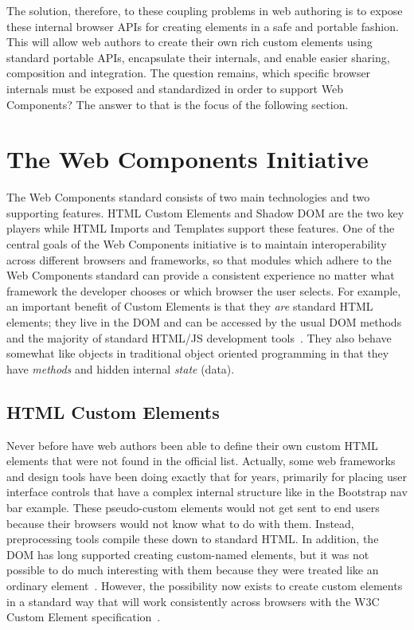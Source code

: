The solution, therefore, to these coupling problems in web authoring is to expose these internal browser APIs for creating elements in a safe and portable fashion. 
This will allow web authors to create their own rich custom elements using standard portable APIs, encapsulate their internals, and enable easier sharing, composition and integration.
The question remains, which specific browser internals must be exposed and standardized in order to support Web Components?
The answer to that is the focus of the following section.

\section{The Web Components Initiative}

The Web Components standard consists of two main technologies and two supporting features. 
HTML Custom Elements and Shadow DOM are the two key players while HTML Imports and Templates support these features. 
One of the central goals of the Web Components initiative is to maintain interoperability across different browsers and frameworks, 
so that modules which adhere to the Web Components standard can provide a consistent experience no matter what framework the developer chooses or which browser the user selects.
For example, an important benefit of Custom Elements is that they \textit{are} standard HTML elements; they live in the DOM and can be accessed by the usual DOM methods and the majority of standard HTML/JS development tools~\cite{penades2015}.
They also behave somewhat like objects in traditional object oriented programming in that 
they have \textit{methods} and hidden internal \textit{state} (data).

\subsection{HTML Custom Elements}
Never before have web authors been able to define their own custom HTML elements that were not found in the official list.
Actually, some web frameworks and design tools have been doing exactly that for years, primarily for placing user interface controls that have a complex internal structure like in the Bootstrap nav bar example.
These pseudo-custom elements would not get sent to end users because their browsers would not know what to do with them.
Instead, preprocessing tools compile these down to standard HTML.
In addition, the DOM has long supported creating custom-named elements, but it was not possible to do much interesting with them because they were treated like an ordinary 
 element~\cite{w3ccontributors2015-b}.
However, the possibility now exists to create custom elements in a standard way that will work consistently across browsers with the W3C Custom Element
specification~\cite{w3ccontributors2015-b}. 

